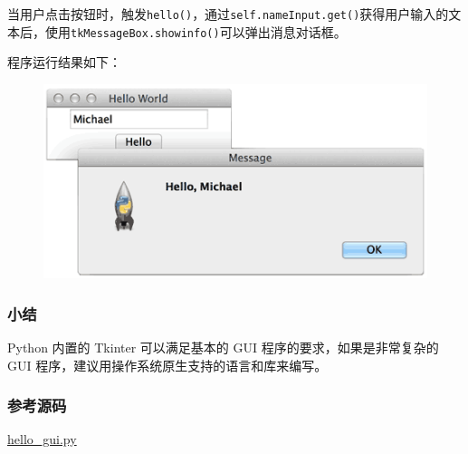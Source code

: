 当用户点击按钮时，触发\texttt{hello()}，通过\texttt{self.nameInput.get()}获得用户输入的文本后，使用\texttt{tkMessageBox.showinfo()}可以弹出消息对话框。

程序运行结果如下：

 
 \begin{figure}[htp]
	\centering
	\includegraphics[width=0.6\linewidth]{fig/972677353581536.png}
\end{figure}


\hypertarget{ux5c0fux7ed3}{%
\subsubsection{小结}\label{ux5c0fux7ed3}}

Python 内置的 Tkinter 可以满足基本的 GUI 程序的要求，如果是非常复杂的
GUI 程序，建议用操作系统原生支持的语言和库来编写。

\hypertarget{ux53c2ux8003ux6e90ux7801}{%
\subsubsection{参考源码}\label{ux53c2ux8003ux6e90ux7801}}

\href{https://github.com/michaelliao/learn-python3/blob/master/samples/gui/hello_gui.py}{hello\_gui.py}

